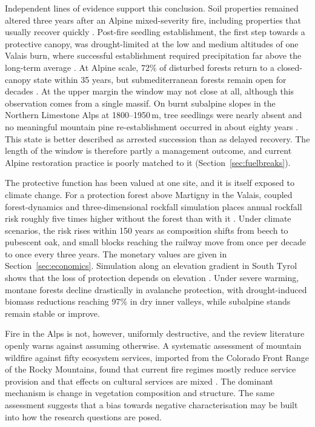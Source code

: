 \documentclass[11pt,a4paper]{article}
\begin{document}
Independent lines of evidence support this conclusion. Soil properties remained altered three years after an Alpine mixed-severity fire, including properties that usually recover quickly \citep{negri_wildfire_2026}. Post-fire seedling establishment, the first step towards a protective canopy, was drought-limited at the low and medium altitudes of one Valais burn, where successful establishment required precipitation far above the long-term average \citep{moser_potential_2010}. At Alpine scale, 72\% of disturbed forests return to a closed-canopy state within 35 years, but submediterranean forests remain open for decades \citep{stritih_alternative_2023}. At the upper margin the window may not close at all, although this observation comes from a single massif. On burnt subalpine slopes in the Northern Limestone Alps at 1800--1950\,m, tree seedlings were nearly absent and no meaningful mountain pine re-establishment occurred in about eighty years \citep{degiuli_arrested_2024}. This state is better described as arrested succession than as delayed recovery. The length of the window is therefore partly a management outcome, and current Alpine restoration practice is poorly matched to it (Section~\ref{sec:fuelbreaks}).

The protective function has been valued at one site, and it is itself exposed to climate change. For a protection forest above Martigny in the Valais, coupled forest-dynamics and three-dimensional rockfall simulation places annual rockfall risk roughly five times higher without the forest than with it \citep{moos_climate_2021}. Under climate scenarios, the risk rises within 150 years as composition shifts from beech to pubescent oak, and small blocks reaching the railway move from once per decade to once every three years. The monetary values are given in Section~\ref{sec:economics}. Simulation along an elevation gradient in South Tyrol shows that the loss of protection depends on elevation \citep{hillebrand_contrasting_2023}. Under severe warming, montane forests decline drastically in avalanche protection, with drought-induced biomass reductions reaching 97\% in dry inner valleys, while subalpine stands remain stable or improve.

Fire in the Alps is not, however, uniformly destructive, and the review literature openly warns against assuming otherwise. A systematic assessment of mountain wildfire against fifty ecosystem services, imported from the Colorado Front Range of the Rocky Mountains, found that current fire regimes mostly reduce service provision and that effects on cultural services are mixed \citep{vukomanovic_systematic_2019}. The dominant mechanism is change in vegetation composition and structure. The same assessment suggests that a bias towards negative characterisation may be built into how the research questions are posed.
\end{document}

